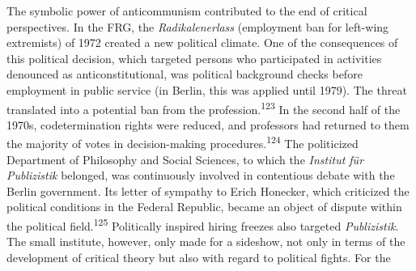 \documentclass{tufte-handout}
\begin{document}
The symbolic power of anticommunism contributed to the end of critical
perspectives. In the FRG, the \emph{Radikalenerlass} (employment ban for
left-wing extremists) of 1972 created a new political climate. One of
the consequences of this political decision, which targeted persons who
participated in activities denounced as anticonstitutional, was
political background checks before employment in public service (in
Berlin, this was applied until 1979). The threat translated into a
potential ban from the profession.\textsuperscript{123} In the second half of the 1970s,
codetermination rights were reduced, and professors had returned to them
the majority of votes in decision-making procedures.\textsuperscript{124} The politicized Department of
Philosophy and Social Sciences, to which the \emph{Institut für
Publizistik} belonged, was continuously involved in contentious debate
with the Berlin government. Its letter of sympathy to Erich Honecker,
which criticized the political conditions in the Federal Republic,
became an object of dispute within the political field.\textsuperscript{125} Politically inspired hiring
freezes also targeted \emph{Publizistik}. The small institute, however,
only made for a sideshow, not only in terms of the development of
critical theory but also with regard to political fights. For the
\end{document}
